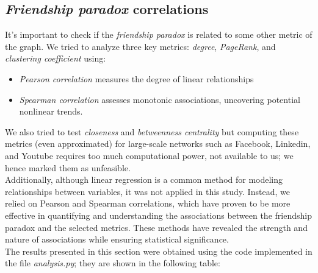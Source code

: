 \documentclass{article}
\begin{document}
\subsection{\textit{Friendship paradox} correlations}

It's important to check if the \textit{friendship paradox} is related to some other metric of the graph. We tried to analyze three key metrics: \textit{degree}, \textit{PageRank}, and \textit{clustering coefficient} using:
\begin{itemize}
    \item \textit{Pearson correlation} measures the degree of linear relationships
    \item \textit{Spearman correlation} assesses monotonic associations, uncovering potential nonlinear trends.
\end{itemize}
We also tried to test \textit{closeness} and \textit{betweenness centrality} but computing these metrics (even approximated) for large-scale networks such as Facebook, Linkedin, and Youtube requires too much computational power, not available to us; we hence marked them as unfeasible. \\
Additionally, although linear regression is a common method for modeling relationships between variables, it was not applied in this study.
Instead, we relied on Pearson and Spearman correlations, which have proven to be more effective in quantifying and understanding the associations between the friendship paradox and the selected metrics. These methods have revealed the strength and nature of associations while ensuring statistical significance. \\
The results presented in this section were obtained using the code implemented in the file \textit{analysis.py}; they are shown in the following table: \\
\end{document}

